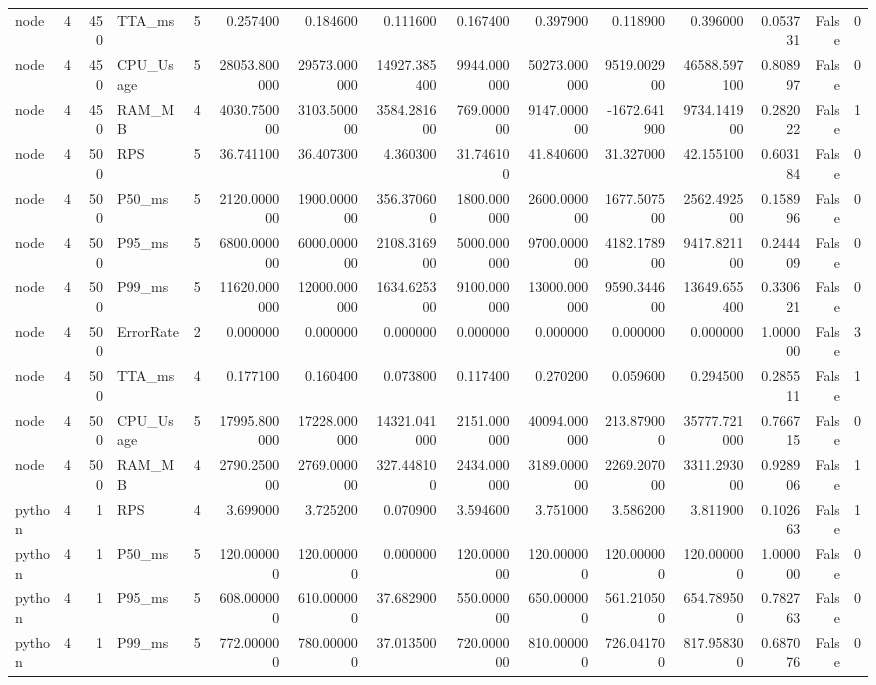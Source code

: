 \begin{tabular}{lrrlrrrrrrrrrrr}
node & 4 & 450 & TTA_ms & 5 & 0.257400 & 0.184600 & 0.111600 & 0.167400 & 0.397900 & 0.118900 & 0.396000 & 0.053731 & False & 0 \\
node & 4 & 450 & CPU_Usage & 5 & 28053.800000 & 29573.000000 & 14927.385400 & 9944.000000 & 50273.000000 & 9519.002900 & 46588.597100 & 0.808997 & False & 0 \\
node & 4 & 450 & RAM_MB & 4 & 4030.750000 & 3103.500000 & 3584.281600 & 769.000000 & 9147.000000 & -1672.641900 & 9734.141900 & 0.282022 & False & 1 \\
node & 4 & 500 & RPS & 5 & 36.741100 & 36.407300 & 4.360300 & 31.746100 & 41.840600 & 31.327000 & 42.155100 & 0.603184 & False & 0 \\
node & 4 & 500 & P50_ms & 5 & 2120.000000 & 1900.000000 & 356.370600 & 1800.000000 & 2600.000000 & 1677.507500 & 2562.492500 & 0.158996 & False & 0 \\
node & 4 & 500 & P95_ms & 5 & 6800.000000 & 6000.000000 & 2108.316900 & 5000.000000 & 9700.000000 & 4182.178900 & 9417.821100 & 0.244409 & False & 0 \\
node & 4 & 500 & P99_ms & 5 & 11620.000000 & 12000.000000 & 1634.625300 & 9100.000000 & 13000.000000 & 9590.344600 & 13649.655400 & 0.330621 & False & 0 \\
node & 4 & 500 & ErrorRate & 2 & 0.000000 & 0.000000 & 0.000000 & 0.000000 & 0.000000 & 0.000000 & 0.000000 & 1.000000 & False & 3 \\
node & 4 & 500 & TTA_ms & 4 & 0.177100 & 0.160400 & 0.073800 & 0.117400 & 0.270200 & 0.059600 & 0.294500 & 0.285511 & False & 1 \\
node & 4 & 500 & CPU_Usage & 5 & 17995.800000 & 17228.000000 & 14321.041000 & 2151.000000 & 40094.000000 & 213.879000 & 35777.721000 & 0.766715 & False & 0 \\
node & 4 & 500 & RAM_MB & 4 & 2790.250000 & 2769.000000 & 327.448100 & 2434.000000 & 3189.000000 & 2269.207000 & 3311.293000 & 0.928906 & False & 1 \\
python & 4 & 1 & RPS & 4 & 3.699000 & 3.725200 & 0.070900 & 3.594600 & 3.751000 & 3.586200 & 3.811900 & 0.102663 & False & 1 \\
python & 4 & 1 & P50_ms & 5 & 120.000000 & 120.000000 & 0.000000 & 120.000000 & 120.000000 & 120.000000 & 120.000000 & 1.000000 & False & 0 \\
python & 4 & 1 & P95_ms & 5 & 608.000000 & 610.000000 & 37.682900 & 550.000000 & 650.000000 & 561.210500 & 654.789500 & 0.782763 & False & 0 \\
python & 4 & 1 & P99_ms & 5 & 772.000000 & 780.000000 & 37.013500 & 720.000000 & 810.000000 & 726.041700 & 817.958300 & 0.687076 & False & 0 \\

\end{tabular}
